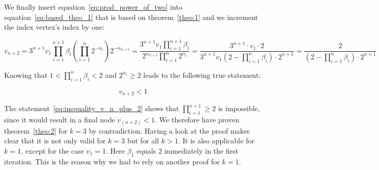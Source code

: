 We finally insert equation~\ref{eq:prod_power_of_two} into equation~\ref{eq:based_theo_1} that is based on theorem~\ref{theo:1} and we increment the index vertex's index by one:

\[
v_{n+2}=3^{n+1}v_1\prod_{i=1}^{n+1}\beta_i\left(\prod_{i=1}^{n}2^{-\alpha_i}\right)2^{-\alpha_{n+1}}=\frac{3^{n+1}v_1\prod_{i=1}^{n+1}\beta_i}{2^{\alpha_{n+1}}\prod_{i=1}^{n}2^{\alpha_i}}=\frac{3^{n+1}\cdot v_1\cdot2}{3^{n+1}v_1\left(2-\prod_{i=1}^{n}\beta_i\right)\cdot2^{n+1}}=\frac{2}{\left(2-\prod_{i=1}^{n}\beta_i\right)\cdot2^{n+1}}
\]

Knowing that $1<\prod_{i=1}^{n}\beta_i<2$ and $2^{\alpha_i}\ge2$ leads to the following true statement:

\begin{equation}
\label{eq:inequality_v_n_plus_2}
v_{n+2}<1
\end{equation}

The statement~\ref{eq:inequality_v_n_plus_2} shows that $\prod_{i=1}^{n+1}\ge2$ is impossible, since it would result in a final node $v_(n+2)<1$. We therefore have proven theorem~\ref{theo:2} for $k=3$ by contradiction. Having a look at the proof makes clear that it is not only valid for $k=3$ but for all $k>1$. It is also applicable for $k=1$, except for the case $v_1=1$. Here  $\beta_1$ equals $2$ immediately in the first iteration. This is the reason why we had to rely on another proof for $k=1$.
